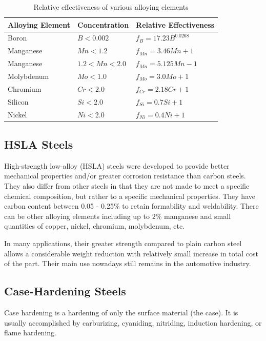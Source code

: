 \documentclass[
10pt,
a4paper,
openany,
svgnames,
]{book}
\begin{document}
\begin{table}[h]
  \centering
  \caption{Relative effectiveness of various alloying elements \cite{datsko1977materials}}
  \label{table: effective alloys}
  {\renewcommand{\arraystretch}{1.4}
    \begin{tabular}{lll}
      \toprule
      Alloying Element & Concentration & Relative Effectiveness \\
      \midrule
      Boron & $B < 0.002$ & $f_B = 17.23B^{0.0268}$\\
      Manganese & $Mn < 1.2$ & $f_{Mn} = 3.46Mn + 1$ \\
      Manganese & $1.2 < M\!n < 2.0$ & $f_{Mn} = 5.125M\!n - 1$ \\
      Molybdenum & $M\!o < 1.0$ & $f_{Mo} = 3.0M\!o + 1$ \\
      Chromium & $Cr < 2.0$ & $f_{Cr} = 2.18Cr + 1$ \\
      Silicon & $Si < 2.0$ & $f_{Si} = 0.7Si + 1$ \\
      Nickel & $Ni < 2.0$ & $f_{Ni} = 0.4Ni + 1$ \\
    \bottomrule
  \end{tabular}}
\end{table}

\subsection{HSLA Steels}

High-strength low-alloy (HSLA) steels were developed to provide better mechanical properties and/or greater corrosion resistance than carbon steels. They also differ from other steels in that they are not made to meet a specific chemical composition, but rather to a specific mechanical properties. They have carbon content between 0.05 - 0.25\% to retain formability and weldability. There can be other alloying elements including up to 2\% manganese and small quantities of copper, nickel, chromium, molybdenum, etc.

In many applications, their greater strength compared to plain carbon steel allows a considerable weight reduction with relatively small increase in total cost of the part. Their main use nowadays still remains in the automotive industry.

\subsection{Case-Hardening Steels}

Case hardening is a hardening of only the surface material (the case). It is usually accomplished by carburizing, cyaniding, nitriding, induction hardening, or flame hardening.
\end{document}
